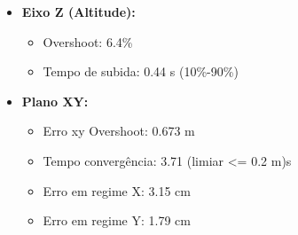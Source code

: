 \begin{itemize}
  \item \textbf{Eixo Z (Altitude):}
  \begin{itemize}
    \item Overshoot: 6.4\%
    \item Tempo de subida: 0.44 s (10\%-90\%)
  \end{itemize}
  \item \textbf{Plano XY:}
  \begin{itemize}
    \item Erro xy Overshoot: 0.673 m
    \item Tempo convergência: 3.71 (limiar <= 0.2 m)s
    \item Erro em regime X: 3.15 cm
    \item Erro em regime Y: 1.79 cm
  \end{itemize}
\end{itemize}
